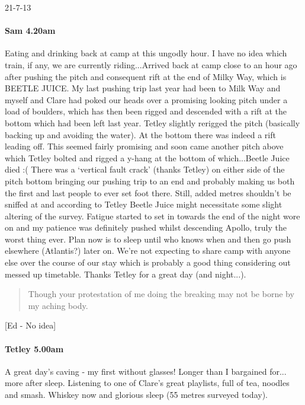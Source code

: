 21-7-13



\paragraph{Sam 4.20am}
Eating and drinking back at camp at this ungodly hour. I have no idea which train, if any, we are currently riding...Arrived back at camp close to an hour ago after pushing the pitch and consequent rift at the end of Milky Way, which is BEETLE JUICE. My last pushing trip last year had been to Milk Way and myself and Clare had poked our heads over a promising looking pitch under a load of boulders, which has then been rigged and descended with a rift at the bottom which had been left last year. Tetley slightly rerigged the pitch (basically backing up and avoiding the water). At the bottom there was indeed a rift leading off. This seemed fairly promising and soon came another pitch above which Tetley bolted and rigged a y-hang at the bottom of which...Beetle Juice died :( There was a ‘vertical fault crack’ (thanks Tetley) on either side of the pitch bottom bringing our pushing trip to an end and probably making us both the first and last people to ever set foot there. Still, added metres shouldn't be sniffed at and according to Tetley Beetle Juice might necessitate some slight altering of the survey. Fatigue started to set in towards the end of the night wore on and my patience was definitely pushed whilst descending Apollo, truly the worst thing ever. Plan now is to sleep until who knows when and then go push elsewhere (Atlantis?) later on. We’re not expecting to share camp with anyone else over the course of our stay which is probably a good thing considering out messed up timetable.
Thanks Tetley for a great day (and night...). 

\begin{quote}Though your protestation of me doing the breaking may not be borne by my aching body. \end{quote} 
[Ed - No idea]


\paragraph{Tetley 5.00am}
A great day’s caving - my first without glasses! Longer than I bargained for... more after sleep. Listening to one of Clare’s great playlists, full of tea, noodles and smash. Whiskey now and glorious sleep (55 metres surveyed today).

